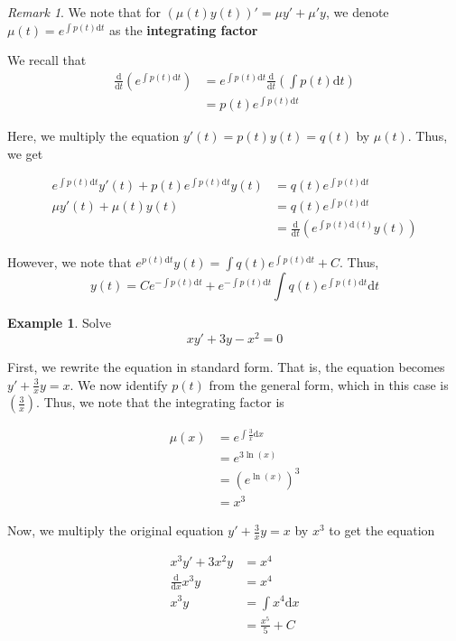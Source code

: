 \documentclass[11pt]{article}
\theoremstyle{plain} %
\theoremstyle{definition}
\theoremstyle{example}
\newtheorem*{example}{Example}
\theoremstyle{remark}
\newtheorem*{remark}{Remark}
\begin{document}
\begin{remark}
We note that for $(\mu(t)y(t))' = \mu y' + \mu' y$, we denote $\mu(t)=e^{\int p(t)\mathrm d t}$ as the \textbf{integrating factor}
\end{remark}


We recall that \begin{align*}\frac{\mathrm d}{\mathrm d t}\left(e^{\int p(t)\mathrm d t}\right) &= e^{\int p(t)\mathrm d t} \frac{\mathrm d }{\mathrm d t}\left(\int p(t)\mathrm d t\right)\\
&= p(t)e^{\int p(t)\mathrm d t}
\end{align*}

Here, we multiply the equation $y'(t) = p(t)y(t)= q(t)$ by $\mu(t)$. Thus, we get 

\begin{align*}
	e^{\int p(t) \mathrm d t}y'(t) + p(t)e^{\int p(t) \mathrm d t}y(t) &= q(t) e^{\int p(t) \mathrm d t}\\
	\mu y'(t) + \mu(t)y(t) &= q(t)e^{\int p(t) \mathrm d t}\\
	&= \frac{\mathrm d}{\mathrm d t} \left(e^{\int p(t) \mathrm d (t)}y(t) \right)
\end{align*}

However, we note that $e^{p(t) \mathrm d t} y(t) = \int q(t) e^{\int p(t) \mathrm d t} + C$. Thus, 
$$y(t) = Ce^{-\int p(t) \mathrm d t} + e^{-\int p(t) \mathrm d t}\int q(t)e^{\int p(t) \mathrm d t}\mathrm d t$$


\begin{example}
	Solve $$xy' + 3y-x^2=0$$
\end{example}

First, we rewrite the equation in standard form. That is, the equation becomes $y' + \frac{3}{x}y = x$. We now identify $p(t)$ from the general form, which in this case is $\left(\frac{3}{x}\right)$. Thus, we note that the integrating factor is 

\begin{align*}
\mu(x) &= e^{\int \frac{3}{x} \mathrm d x} \\
&= e^{3 \ln(x)} \\
&= \left(e^{\ln(x)}\right)^3 \\
&= x^3
\end{align*}

Now, we multiply the original equation $y'+\frac{3}{x}y=x$ by $x^3$ to get the equation 

\begin{align*}
x^3y' + 3x^2y&=x^4\\
\frac{\mathrm d}{\mathrm d x}x^3y &= x^4\\
x^3y &= \int x^4\mathrm d x \\
&= \frac{x^5}{5}+C
\end{align*}
\end{document}
